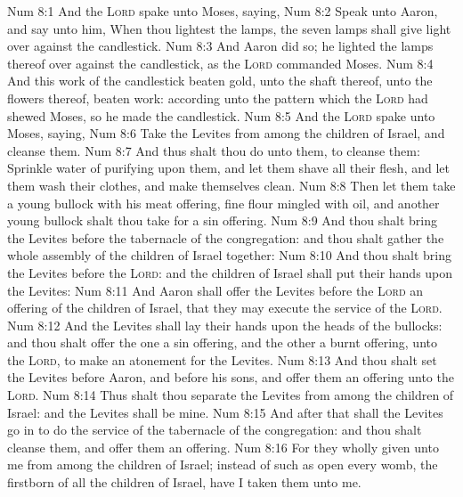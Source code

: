 \vs Num 8:1 And the \textsc{Lord} spake unto Moses, saying,
\vs Num 8:2 Speak unto Aaron, and say unto him, When thou lightest the lamps, the seven lamps shall give light over against the candlestick.
\vs Num 8:3 And Aaron did so; he lighted the lamps thereof over against the candlestick, as the \textsc{Lord} commanded Moses.
\vs Num 8:4 And this work of the candlestick  beaten gold, unto the shaft thereof, unto the flowers thereof,  beaten work: according unto the pattern which the \textsc{Lord} had shewed Moses, so he made the candlestick.
\vs Num 8:5 And the \textsc{Lord} spake unto Moses, saying,
\vs Num 8:6 Take the Levites from among the children of Israel, and cleanse them.
\vs Num 8:7 And thus shalt thou do unto them, to cleanse them: Sprinkle water of purifying upon them, and let them shave all their flesh, and let them wash their clothes, and  make themselves clean.
\vs Num 8:8 Then let them take a young bullock with his meat offering,  fine flour mingled with oil, and another young bullock shalt thou take for a sin offering.
\vs Num 8:9 And thou shalt bring the Levites before the tabernacle of the congregation: and thou shalt gather the whole assembly of the children of Israel together:
\vs Num 8:10 And thou shalt bring the Levites before the \textsc{Lord}: and the children of Israel shall put their hands upon the Levites:
\vs Num 8:11 And Aaron shall offer the Levites before the \textsc{Lord}  an offering of the children of Israel, that they may execute the service of the \textsc{Lord}.
\vs Num 8:12 And the Levites shall lay their hands upon the heads of the bullocks: and thou shalt offer the one  a sin offering, and the other  a burnt offering, unto the \textsc{Lord}, to make an atonement for the Levites.
\vs Num 8:13 And thou shalt set the Levites before Aaron, and before his sons, and offer them  an offering unto the \textsc{Lord}.
\vs Num 8:14 Thus shalt thou separate the Levites from among the children of Israel: and the Levites shall be mine.
\vs Num 8:15 And after that shall the Levites go in to do the service of the tabernacle of the congregation: and thou shalt cleanse them, and offer them  an offering.
\vs Num 8:16 For they  wholly given unto me from among the children of Israel; instead of such as open every womb,  the firstborn of all the children of Israel, have I taken them unto me.
